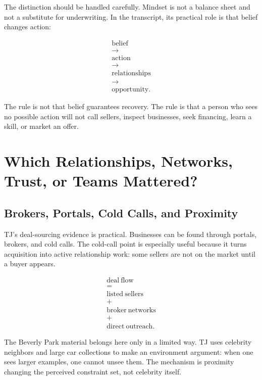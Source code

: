 \documentclass[11pt,oneside]{book}
\begin{document}
The distinction should be handled carefully. Mindset is not a balance sheet and not a substitute for underwriting. In the transcript, its practical role is that belief changes action:

\begin{equation}
\begin{gathered}
\mathrm{belief}\\
\longrightarrow\\
\mathrm{action}\\
\longrightarrow\\
\mathrm{relationships}\\
\longrightarrow\\
\mathrm{opportunity}.
\end{gathered}
\end{equation}

The rule is not that belief guarantees recovery. The rule is that a person who sees no possible action will not call sellers, inspect businesses, seek financing, learn a skill, or market an offer.

\chapter{Which Relationships, Networks, Trust, or Teams Mattered?}

\section{Brokers, Portals, Cold Calls, and Proximity}

TJ's deal-sourcing evidence is practical. Businesses can be found through portals, brokers, and cold calls. The cold-call point is especially useful because it turns acquisition into active relationship work: some sellers are not on the market until a buyer appears.

\begin{equation}
\begin{gathered}
\mathrm{deal\ flow}\\
=\\
\mathrm{listed\ sellers}\\
+\\
\mathrm{broker\ networks}\\
+\\
\mathrm{direct\ outreach}.
\end{gathered}
\end{equation}

The Beverly Park material belongs here only in a limited way. TJ uses celebrity neighbors and large car collections to make an environment argument: when one sees larger examples, one cannot unsee them. The mechanism is proximity changing the perceived constraint set, not celebrity itself.
\end{document}
